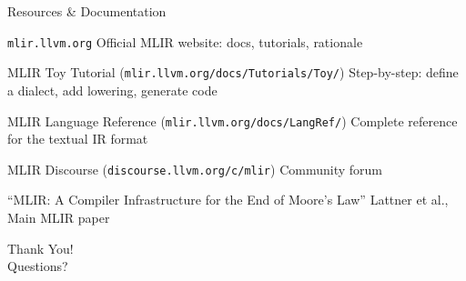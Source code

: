 \begin{frame}[shrink=5]{Resources \& Documentation}
  \bigskip
  \begin{block}{\texttt{mlir.llvm.org}}
    Official MLIR website: docs, tutorials, rationale
  \end{block}
  \begin{block}{MLIR Toy Tutorial (\texttt{mlir.llvm.org/docs/Tutorials/Toy/})}
    Step-by-step: define a dialect, add lowering, generate code
  \end{block}
  \begin{exampleblock}{MLIR Language Reference
      (\texttt{mlir.llvm.org/docs/LangRef/})}
    Complete reference for the textual IR format
  \end{exampleblock}
  \begin{exampleblock}{MLIR Discourse (\texttt{discourse.llvm.org/c/mlir})}
    Community forum
  \end{exampleblock}
  \begin{block}{``MLIR: A Compiler Infrastructure for the End of Moore's Law''}
    Lattner et al., Main MLIR paper
  \end{block}
\end{frame}


\begin{frame}[plain]{}
\Huge\centering
Thank You!\\
\bigskip
\normalsize
Questions?
\end{frame}




